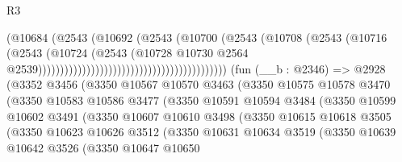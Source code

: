 \begin{lexlean}{R3}
\begin{coremodule}
                                                                (@10684
                                                                  (@2543
                                                                    (@10692
                                                                      (@2543
                                                                        (@10700
                                                                          (@2543
                                                                            (@10708
                                                                              (@2543
                                                                                (@10716
                                                                                  (@2543
                                                                                    (@10724
                                                                                      (@2543
                                                                                        (@10728
                                                                                          @10730
                                                                                          @2564
                                                                                          @2539)))))))))))))))))))))))))))))))))))))))))))
    (fun (__b : @2346) =>
    @2928
      (@3352
        @3456
        (@3350
          @10567
          @10570
          @3463
          (@3350
            @10575
            @10578
            @3470
            (@3350
              @10583
              @10586
              @3477
              (@3350
                @10591
                @10594
                @3484
                (@3350
                  @10599
                  @10602
                  @3491
                  (@3350
                    @10607
                    @10610
                    @3498
                    (@3350
                      @10615
                      @10618
                      @3505
                      (@3350
                        @10623
                        @10626
                        @3512
                        (@3350
                          @10631
                          @10634
                          @3519
                          (@3350
                            @10639
                            @10642
                            @3526
                            (@3350
                              @10647
                              @10650

\end{coremodule}
\end{lexlean}
